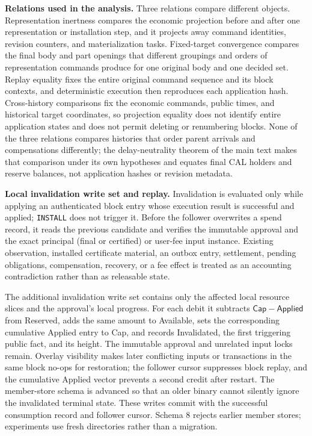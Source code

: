 \noindent\textbf{Relations used in the analysis.}
Three relations compare different objects. Representation inertness compares the economic projection before and after one representation or installation step, and it projects away command identities, revision counters, and materialization tasks. Fixed-target convergence compares the final body and part openings that different groupings and orders of representation commands produce for one original body and one decided set. Replay equality fixes the entire original command sequence and its block contexts, and deterministic execution then reproduces each application hash. Cross-history comparisons fix the economic commands, public times, and historical target coordinates, so projection equality does not identify entire application states and does not permit deleting or renumbering blocks. None of the three relations compares histories that order parent arrivals and compensations differently; the delay-neutrality theorem of the main text makes that comparison under its own hypotheses and equates final CAL holders and reserve balances, not application hashes or revision metadata.

\noindent\textbf{Local invalidation write set and replay.}
Invalidation is evaluated only while applying an authenticated block
entry whose execution result is successful and applied; \texttt{INSTALL}
does not trigger it.  Before the follower overwrites a spend record, it
reads the previous candidate and verifies the immutable approval and
the exact principal (final or certified) or user-fee input instance.  Existing observation,
installed certificate material, an outbox entry, settlement, pending
obligations, compensation, recovery, or a fee effect is treated as an
accounting contradiction rather than as releasable state.

The additional invalidation write set contains only the affected local resource slices
and the approval's local progress.  For each debit it subtracts
$\mathsf{Cap}-\mathsf{Applied}$ from Reserved, adds the same amount to
Available, sets the corresponding cumulative Applied entry to Cap,
and records Invalidated, the first triggering public fact, and its
height.  The immutable approval and unrelated input locks remain.
Overlay visibility makes later conflicting inputs or transactions in
the same block no-ops for restoration; the follower cursor suppresses
block replay, and the cumulative Applied vector prevents a second
credit after restart.  The member-store schema is advanced so that an
older binary cannot silently ignore the invalidated terminal state. These writes commit with the successful consumption record and follower cursor. Schema 8 rejects earlier member stores; experiments use fresh directories rather than a migration.

